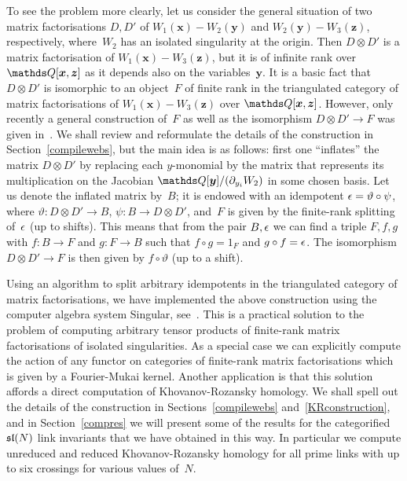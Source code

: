 \documentclass{compositio}
\theoremstyle{definition}
\numberwithin{equation}{section}
\begin{document}
To see the problem more clearly, let us consider the general situation of two matrix factorisations $D,D'$ of $W_{1}(\boldsymbol{x})-W_{2}(\boldsymbol{y})$ and $W_{2}(\boldsymbol{y})-W_{3}(\boldsymbol{z})$, respectively, where~$W_{2}$ has an isolated singularity at the origin. Then $D\otimes D'$ is a matrix factorisation of $W_{1}(\boldsymbol{x})-W_{3}(\boldsymbol{z})$, but it is of infinite rank over $\nQ[\boldsymbol{x},\boldsymbol{z}]$ as it depends also on the variables~$\boldsymbol{y}$. It is a basic fact that $D\otimes D'$ is isomorphic to an object~$F$ of finite rank in the triangulated category of matrix factorisations of $W_{1}(\boldsymbol{x})-W_{3}(\boldsymbol{z})$ over $\nQ[\boldsymbol{x},\boldsymbol{z}]$. However, only recently a general construction of~$F$ as well as the isomorphism $D\otimes D'\longrightarrow F$ was given in~\cite{dm1102.2957}. We shall review and reformulate the details of the construction in Section~\ref{compilewebs}, but the main idea is as follows:  first one ``inflates'' the matrix $D\otimes D'$ by replacing each $y$-monomial by the matrix that represents its multiplication on the Jacobian $\nQ[\boldsymbol{y}]/(\partial_{y_{i}} W_{2})$ in some chosen basis. Let us denote the inflated matrix by~$B$; it is endowed with an idempotent $\epsilon=\vartheta\circ\psi$, where $\vartheta: D\otimes D'\longrightarrow B$, $\psi: B\longrightarrow D\otimes D'$, and~$F$ is given by the finite-rank splitting of~$\epsilon$ (up to shifts). This means that from the pair $B,\epsilon$ we can find a triple $F,f,g$ with $f:B\longrightarrow F$ and $g:F\longrightarrow B$ such that $f\circ g=1_{F}$ and $g\circ f=\epsilon$. The isomorphism $D\otimes D'\longrightarrow F$ is then given by $f\circ\vartheta$ (up to a shift). 

Using an algorithm to split arbitrary idempotents in the triangulated category of matrix factorisations, we have implemented the above construction using the computer algebra system Singular, see~\cite{cmWebCompileCode}. This is a practical solution to the problem of computing arbitrary tensor products of finite-rank matrix factorisations of isolated singularities. As a special case we can explicitly compute the action of any functor on categories of finite-rank matrix factorisations which is given by a Fourier-Mukai kernel. Another application is that this solution affords a direct computation of Khovanov-Rozansky homology. We shall spell out the details of the construction in Sections~\ref{compilewebs} and~\ref{KRconstruction}, and in Section~\ref{compres} we will present some of the results for the categorified $\mathfrak{sl}(N)$ link invariants that we have obtained in this way. In particular we compute unreduced and reduced Khovanov-Rozansky homology for all prime links with up to six crossings for various values of~$N$. 
\end{document}
